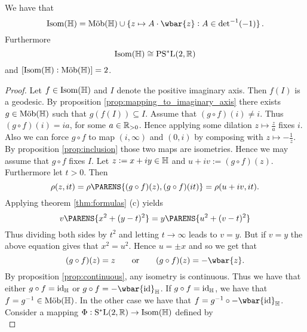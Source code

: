\begin{theorem}
	We have that
	\begin{equation}
		\Isom(\Hbb) = \Mob(\Hbb) \cup \cbr[0]{z \mapsto A \cdot \wbar{z} : A \in \det^{-1}(-1)}.
	\end{equation}
	Furthermore
	\begin{equation}
		\mathrm{Isom}(\mathbb{H}) \cong \mathrm{PS^*L}(2,\mathbb{R})
	\end{equation}
	\noindent and $\sbr[0]{\Isom(\Hbb) : \Mob(\Hbb)} = 2$.
\end{theorem}

\begin{proof}
	Let $f \in \mathrm{Isom}(\mathbb{H})$ and $I$ denote the positive imaginary axis. Then $f(I)$ is a geodesic. By proposition \ref{prop:mapping_to_imaginary_axis} there exists $g \in \mathrm{M\ddot{o}b}(\mathbb{H})$ such that $g(f(I)) \subseteq I$. Assume that $(g \circ f)(i) \neq i$. Thus $(g \circ f)(i) = ia$, for some $a \in \mathbb{R}_{>0}$. Hence applying some dilation $z \mapsto \frac{z}{a}$ fixes $i$. Also we can force $g \circ f$ to map $(i,\infty)$ and $(0,i)$ by composing with $z \mapsto -\frac{1}{z}$. By proposition \ref{prop:inclusion} those two maps are isometries. Hence we may assume that $g \circ f$ fixes $I$. Let $z := x + iy \in \mathbb{H}$ and $u + iv := (g \circ f )(z)$. Furthermore let $t > 0$. Then
	\begin{equation*}
		\rho(z,it) = \rho\PARENS{(g \circ f)(z),(g \circ f)(it)} = \rho(u + iv, it).
	\end{equation*}
	Applying theorem \ref{thm:formulas} (c) yields
	\begin{equation*}
		v\PARENS{x^2 + (y - t)^2} = y\PARENS{u^2 + (v - t)^2}
	\end{equation*}
	Thus dividing both sides by $t^2$ and letting $t \to \infty$ leads to $v = y$. But if $v = y$ the above equation gives that $x^2 = u^2$. Hence $u = \pm x$ and so we get that
	\begin{equation*}
		(g \circ f)(z) = z \qquad \text{or} \qquad (g \circ f)(z) = - \wbar{z}.
	\end{equation*}
	By proposition \ref{prop:continuous}, any isometry is continuous. Thus we have that either $g \circ f = \operatorname{id}_{\mathbb{H}}$ or $g \circ f = -\wbar{\id}_\Hbb$. If $g \circ f = \operatorname{id}_{\mathbb{H}}$, we have that $f = g^{-1} \in \mathrm{M\ddot{o}b}(\mathbb{H})$. In the other case we have that $f = g^{-1} \circ -\wbar{\id}_\Hbb$.\\
	Consider a mapping $\Phi : \mathrm{S^*L}(2,\mathbb{R}) \to \mathrm{Isom}(\mathbb{H})$ defined by 
	\begin{equation*}

\end{equation*}
\end{proof}
